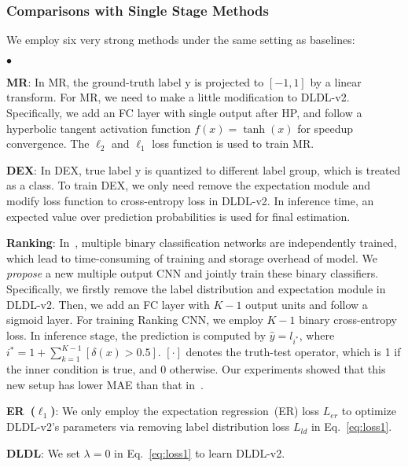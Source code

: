 \documentclass[5p,times,twocolumn]{elsarticle}
\newcommand{\squishlist}{
 \begin{list}{$\bullet$}
  { \setlength{\itemsep}{0pt}
     \setlength{\parsep}{1pt}
     \setlength{\topsep}{1pt}
     \setlength{\partopsep}{0pt}
     \setlength{\leftmargin}{1.5em}
     \setlength{\labelwidth}{1em}
     \setlength{\labelsep}{0.5em} } }
\newcommand{\squishend}{
  \end{list}  }
\begin{document}
\subsubsection{Comparisons with Single Stage Methods}
We employ six very strong methods under the same setting as baselines: 

\squishlist
 \item \textbf{MR}: In MR, the ground-truth label $\mathrm y$ is projected to $[-1,1]$ by a linear transform. For MR, we need to make a little modification to DLDL-v2. Specifically, we add an FC layer with single output after HP, and follow a hyperbolic tangent activation function $f(x) = \tanh(x)$ for speedup convergence. The $\ell_2$ and $\ell_1$ loss function is used to train MR. 
 
 \item \textbf{DEX}: In DEX, true label $\mathrm y$ is quantized to different label group, which is treated as a class. To train DEX, we only need remove the expectation module and modify loss function to cross-entropy loss in DLDL-v2. In inference time, an expected value over prediction probabilities is used for final estimation.

 \item \textbf{Ranking}: In~\cite{chen2017using,Chen2017Deep}, multiple binary classification networks are independently trained, which lead to time-consuming of training and storage overhead of model. We \emph{propose} a new multiple output CNN and jointly train these binary classifiers. Specifically, we firstly remove the label distribution and expectation module in DLDL-v2. Then, we add an FC layer with $K-1$ output units and follow a sigmoid layer. For training Ranking CNN, we employ $K-1$ binary cross-entropy loss. In inference stage, the prediction is computed by $\hat y = l_{i^*}$, where $i^*=1+\sum_{k=1}^{K-1}[\delta(x)>0.5]$. $[\cdot]$ denotes the truth-test operator, which is 1 if the inner condition is true, and 0 otherwise. Our experiments showed that this new setup has lower MAE than that in~\cite{niu2016ordinal,chen2017using,Chen2017Deep}.
 \item \textbf{ER~($\ell_1$)}: We only employ the expectation regression~(ER) loss $L_{er}$ to optimize DLDL-v2's parameters via removing label distribution loss $L_{ld}$ in Eq.~\eqref{eq:loss1}.
 \item \textbf{DLDL}: We set $\lambda=0$ in Eq.~\eqref{eq:loss1} to learn DLDL-v2.
\squishend
\end{document}

